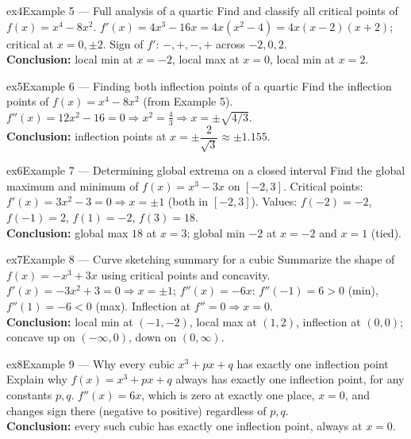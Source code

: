 \documentclass[11pt]{article}
\begin{document}
\begin{example}{ex4}{Example 5 --- Full analysis of a quartic}
Find and classify all critical points of $f(x)=x^4-8x^2$.\soln
$f'(x)=4x^3-16x=4x(x^2-4)=4x(x-2)(x+2)$; critical at $x=0,\pm2$. Sign of $f'$: $-,+,-,+$ across $-2,0,2$.\\[3pt]\textbf{Conclusion:} local min at $x=-2$, local max at $x=0$, local min at $x=2$.
\end{example}

\begin{example}{ex5}{Example 6 --- Finding both inflection points of a quartic}
Find the inflection points of $f(x)=x^4-8x^2$ (from Example 5).\soln
$f''(x)=12x^2-16=0\Rightarrow x^2=\tfrac43\Rightarrow x=\pm\sqrt{4/3}$.\\[3pt]\textbf{Conclusion:} inflection points at $x=\pm\dfrac{2}{\sqrt3}\approx\pm1.155$.
\end{example}

\begin{example}{ex6}{Example 7 --- Determining global extrema on a closed interval}
Find the global maximum and minimum of $f(x)=x^3-3x$ on $[-2,3]$.\soln
Critical points: $f'(x)=3x^2-3=0\Rightarrow x=\pm1$ (both in $[-2,3]$). Values: $f(-2)=-2$, $f(-1)=2$, $f(1)=-2$, $f(3)=18$.\\[3pt]\textbf{Conclusion:} global max $18$ at $x=3$; global min $-2$ at $x=-2$ and $x=1$ (tied).
\end{example}

\begin{example}{ex7}{Example 8 --- Curve sketching summary for a cubic}
Summarize the shape of $f(x)=-x^3+3x$ using critical points and concavity.\soln
$f'(x)=-3x^2+3=0\Rightarrow x=\pm1$; $f''(x)=-6x$: $f''(-1)=6>0$ (min), $f''(1)=-6<0$ (max). Inflection at $f''=0\Rightarrow x=0$.\\[3pt]\textbf{Conclusion:} local min at $(-1,-2)$, local max at $(1,2)$, inflection at $(0,0)$; concave up on $(-\infty,0)$, down on $(0,\infty)$.
\end{example}

\begin{example}{ex8}{Example 9 --- Why every cubic $x^3+px+q$ has exactly one inflection point}
Explain why $f(x)=x^3+px+q$ always has exactly one inflection point, for any constants $p,q$.\soln
$f''(x)=6x$, which is zero at exactly one place, $x=0$, and changes sign there (negative to positive) regardless of $p,q$.\\[3pt]\textbf{Conclusion:} every such cubic has exactly one inflection point, always at $x=0$.
\end{example}
\end{document}
